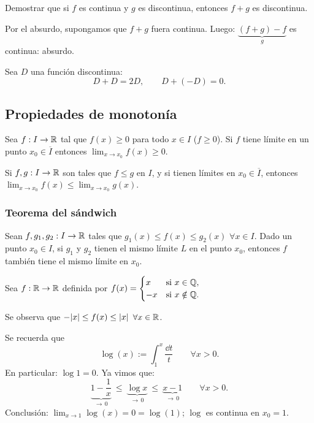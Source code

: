\documentclass[11pt,a4paper]{article}
\newcommand{\Cl}[1]{\overline{#1}}      %
\begin{document}
\begin{ejercicio}
Demostrar que si $f$ es continua y $g$ es discontinua, entonces $f+g$ es discontinua.
\end{ejercicio}

\begin{solucion}
Por el absurdo, supongamos que $f+g$ fuera continua. Luego: $\underbrace{(f+g)-f}_{g}$ es continua: absurdo.
\end{solucion}

Sea $D$ una función discontinua:
\[
  D+D=2D, \qquad D+(-D)=0.
\]

\subsection{Propiedades de monotonía}

\begin{lema}
Sea $f:I\to\mathbb{R}$ tal que $f(x)\geq0$ para todo $x\in I$ ($f\geq0$). Si $f$ tiene límite en un punto $x_0\in\Cl{I}$ entonces $\displaystyle\lim_{x\to x_0}f(x)\geq0$.
\end{lema}

\begin{corolario}
Si $f,g:I\to\mathbb{R}$ son tales que $f\leq g$ en $I$, y si tienen límites en $x_0\in\Cl{I}$, entonces $\displaystyle\lim_{x\to x_0}f(x)\leq\lim_{x\to x_0}g(x)$.
\end{corolario}

\subsubsection*{Teorema del sándwich}

\begin{teorema}
Sean $f,g_1,g_2:I\to\mathbb{R}$ tales que $g_1(x)\leq f(x)\leq g_2(x)$ $\forall x\in I$. Dado un punto $x_0\in I$, si $g_1$ y $g_2$ tienen el mismo límite $L$ en el punto $x_0$, entonces $f$ también tiene el mismo límite en $x_0$.
\end{teorema}

\begin{ejemplo}
Sea $f:\mathbb{R}\to\mathbb{R}$ definida por $f(x)=\begin{cases}x & \text{si } x\in\mathbb{Q},\\ -x & \text{si } x\notin\mathbb{Q}.\end{cases}$

Se observa que $-\lvert x\rvert\leq f(x)\leq\lvert x\rvert$ $\forall x\in\mathbb{R}$.
\end{ejemplo}

\begin{ejemplo}
Se recuerda que
\[
  \log(x) := \int_1^x\frac{\dd t}{t}\qquad\forall x>0.
\]
En particular: $\log 1=0$. Ya vimos que:
\[
  \underbrace{1-\frac1x}_{\to\,0} \ \leq\ \underbrace{\log x}_{\to\,0}\ \leq\ \underbrace{x-1}_{\to\,0}\qquad\forall x>0.
\]
Conclusión: $\displaystyle\lim_{x\to1}\log(x)=0=\log(1)$; $\log$ es continua en $x_0=1$.
\end{ejemplo}
\end{document}
